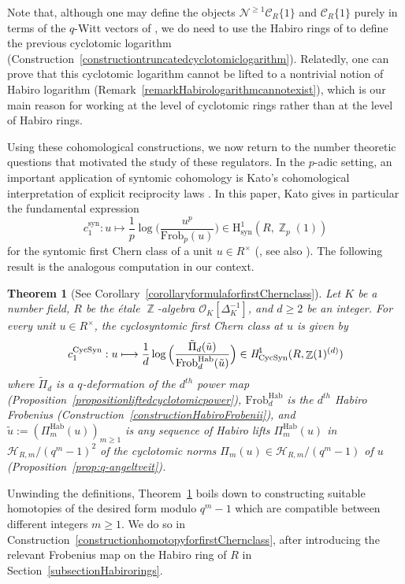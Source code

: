 \documentclass[10pt,twoside]{scrarticle}
\newlength{\mar} \setlength{\mar}{1cm}%
\newlength{\len}
\newtheorem{theoremintro}{Theorem}
\theoremstyle{definition}
\DeclareMathOperator{\Z}{\mathbb{Z}}
\newcommand{\nbrrg}{\mathcal{O}_K[\Delta_K^{-1}]}
\newcommand{\CR}{\mathcal{C}_{R}}
\newcommand{\Frob}{\mathrm{Frob}}
\newcommand{\Hab}{\mathrm{Hab}}
\newcommand{\CycSyn}{\mathrm{CycSyn}}
\renewcommand{\ge}{\geqslant}
\numberwithin{equation}{theorem}
\begin{document}
    Note that, although one may define the objects $\mathcal{N}^{\ge 1} \CR\{1\}$ and $\CR\{1\}$ purely in terms of the $q$-Witt vectors of \cite{wagner_q-witt_2024}, we do need to use the Habiro rings of \cite{garoufalidis_habiro_2024,wagner_q-hodge_2025} to define the previous cyclotomic logarithm (Construction~\ref{constructiontruncatedcyclotomiclogarithm}). Relatedly, one can prove that this cyclotomic logarithm cannot be lifted to a nontrivial notion of Habiro logarithm (Remark~\ref{remarkHabirologarithmcannotexist}), which is our main reason for working at the level of cyclotomic rings rather than at the level of Habiro rings.

    Using these cohomological constructions, we now return to the number theoretic questions that motivated the study of these regulators. In the $p$-adic setting, an important application of syntomic cohomology is Kato's cohomological interpretation of explicit reciprocity laws \cite{kato_explicit_1991}. In this paper, Kato gives in particular the fundamental expression
    $$c_1^{\text{syn}} : u \longmapsto \frac{1}{p} \log\Big(\frac{u^p}{\Frob_p(u)}\Big) \in \text{H}^1_{\text{syn}}(R,\Z_p(1))$$
    for the syntomic first Chern class of a unit $u \in R^{\times}$ (\cite[Corollary~2.9]{kato_explicit_1991}, see also \cite[Proposition~4.1]{gros_regulateurs_1990}). The following result is the analogous computation in our context.

    \begin{theoremintro}[See Corollary~\ref{corollaryformulaforfirstChernclass}]\label{theoremintrocomputationfirstChernclass}
        Let $K$ be a number field, $R$ be the étale $\Z$-algebra $\nbrrg$, and $d \ge 2$ be an integer. For every unit $u \in R^\times$, the cyclosyntomic first Chern class at $u$ is given by
        $$c_1^{\CycSyn} : u \longmapsto \frac{1}{d} \log\Big(\frac{\tilde{\Pi}_d(\tilde{u})}{\Frob_d^{\Hab}(\tilde{u})}\Big) \in \emph{H}^1_{\CycSyn}(R,\Z(1)^{(d)})$$
        where $\tilde{\Pi}_d$ is a $q$-deformation of the $d^{th}$ power map (Proposition~\ref{propositionliftedcyclotomicpower}), $\Frob_d^{\Hab}$ is the $d^{th}$ Habiro Frobenius (Construction~\ref{constructionHabiroFrobenii}), and $\tilde{u} := (\Pi_m^{\Hab}(u))_{m \ge 1}$ is any sequence of Habiro lifts $\Pi_m^{\Hab}(u)$ in $\mathcal{H}_{R,m}/(q^m-1)^2$ of the cyclotomic norms $\Pi_m(u) \in \mathcal{H}_{R,m}/(q^m-1)$ of $u$ (Proposition~\ref{prop:q-angeltveit}).
    \end{theoremintro}

    Unwinding the definitions, Theorem~\ref{theoremintrocomputationfirstChernclass} boils down to constructing suitable homotopies of the desired form modulo $q^m-1$ which are compatible between different integers $m \ge 1$. We do so in Construction~\ref{constructionhomotopyforfirstChernclass}, after introducing the relevant Frobenius map on the Habiro ring of $R$ in Section~\ref{subsectionHabirorings}. 
\end{document}
